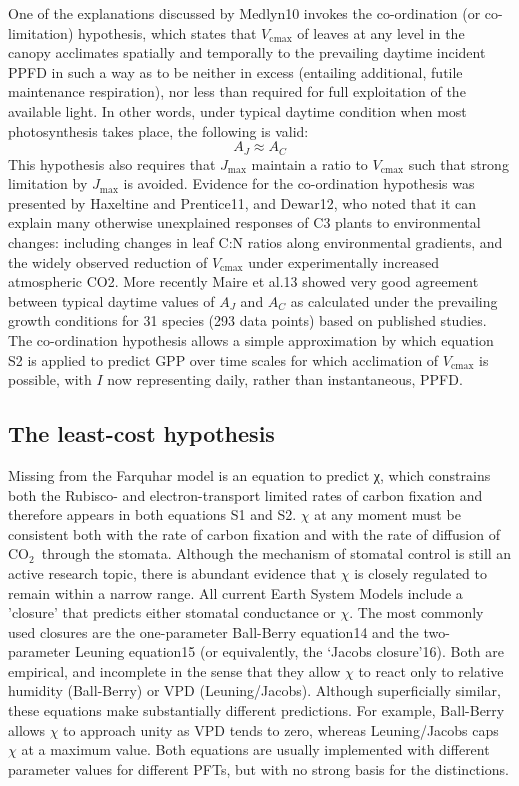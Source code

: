 \documentclass{myreport}
\newcommand{\coo}{CO$_2$}
\begin{document}
One of the explanations discussed by Medlyn10 invokes the co-ordination (or co-limitation) hypothesis, which states that $V_{\mathrm{cmax}}$ of leaves at any level in the canopy acclimates spatially and temporally to the prevailing daytime incident PPFD in such a way as to be neither in excess (entailing additional, futile maintenance respiration), nor less than required for full exploitation of the available light. 
In other words, under typical daytime condition when most photosynthesis takes place, the following is valid:
\begin{equation}
\label{eq:coordination}
    A_J \approx A_C
\end{equation}
This hypothesis also requires that $J_{\mathrm{max}}$ maintain a ratio to $V_{\mathrm{cmax}}$ such that strong limitation by $J_{\mathrm{max}}$ is avoided. 
Evidence for the co-ordination hypothesis was presented by Haxeltine and Prentice11, and Dewar12, who noted that it can explain many otherwise unexplained responses of C3 plants to environmental changes: including changes in leaf C:N ratios along environmental gradients, and the widely observed reduction of $V_{\mathrm{cmax}}$ under experimentally increased atmospheric CO2. More recently Maire et al.13 showed very good agreement between typical daytime values of $A_J$ and $A_C$ as calculated under the prevailing growth conditions for 31 species (293 data points) based on published studies. 
The co-ordination hypothesis allows a simple approximation by which equation S2 is applied to predict GPP over time scales for which acclimation of $V_{\mathrm{cmax}}$ is possible, with $I$ now representing daily, rather than instantaneous, PPFD.

\subsection{The least-cost hypothesis}
\label{sec:least-cost}
Missing from the Farquhar model is an equation to predict χ, which constrains both the Rubisco- and electron-transport limited rates of carbon fixation and therefore appears in both equations S1 and S2. 
$\chi$ at any moment must be consistent both with the rate of carbon fixation and with the rate of diffusion of \coo\ through the stomata. 
Although the mechanism of stomatal control is still an active research topic, there is abundant evidence that $\chi$ is closely regulated to remain within a narrow range. 
All current Earth System Models include a 'closure' that predicts either stomatal conductance or $\chi$. 
The most commonly used closures are the one-parameter Ball-Berry equation14 and the two-parameter Leuning equation15 (or equivalently, the ‘Jacobs closure’16). 
Both are empirical, and incomplete in the sense that they allow $\chi$ to react only to relative humidity (Ball-Berry) or VPD (Leuning/Jacobs). 
Although superficially similar, these equations make substantially different predictions. 
For example, Ball-Berry allows $\chi$ to approach unity as VPD tends to zero, whereas Leuning/Jacobs caps $\chi$ at a maximum value. 
Both equations are usually implemented with different parameter values for different PFTs, but with no strong basis for the distinctions.
\end{document}
